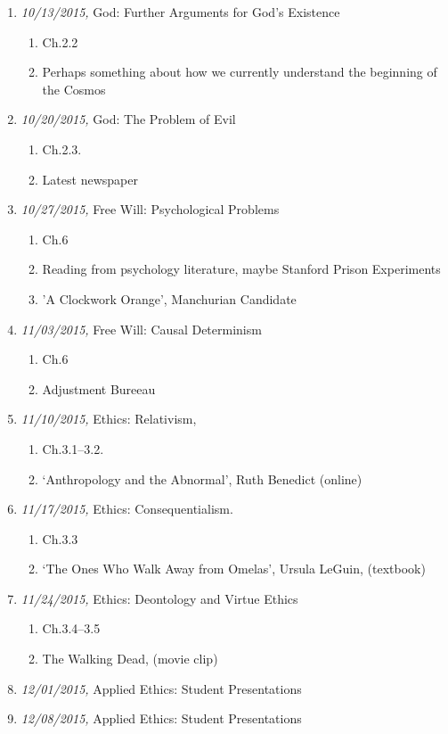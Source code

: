 \documentclass[11pt,article,oneside]{memoir}
\begin{document}
\begin{enumerate}
\item \textit{10/13/2015,} God: Further Arguments for God's Existence
\begin{enumerate}
\item Ch.2.2
\item Perhaps something about how we currently understand the beginning of the Cosmos
\end{enumerate}
\item \textit{10/20/2015,} God: The Problem of Evil 
\begin{enumerate}
\item Ch.2.3.
\item Latest newspaper
\end{enumerate}
\item \textit{10/27/2015,} Free Will: Psychological Problems
\begin{enumerate}
\item Ch.6
\item Reading from psychology literature, maybe Stanford Prison Experiments
\item 'A Clockwork Orange', Manchurian Candidate
\end{enumerate}
\item \textit{11/03/2015,} Free Will: Causal Determinism
\begin{enumerate}
\item Ch.6
\item Adjustment Bureeau
\end{enumerate}
\item \textit{11/10/2015,} Ethics: Relativism, 
\begin{enumerate}
\item Ch.3.1--3.2.
\item `Anthropology and the Abnormal', Ruth Benedict (online)
\end{enumerate}
\item \textit{11/17/2015,} Ethics: Consequentialism. 
\begin{enumerate}
\item Ch.3.3
\item  `The Ones Who Walk Away from Omelas', Ursula LeGuin, (textbook)
\end{enumerate}
\item \textit{11/24/2015,} Ethics: Deontology and Virtue Ethics
\begin{enumerate}
\item Ch.3.4--3.5
\item The Walking Dead, (movie clip)
\end{enumerate}
\item \textit{12/01/2015,} Applied Ethics: Student Presentations
\item \textit{12/08/2015,} Applied Ethics: Student Presentations
\end{enumerate}
\end{document}
